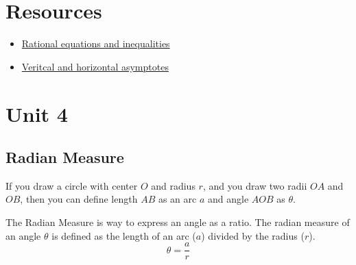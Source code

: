\documentclass{article}
\begin{document}
\section*{Resources}
\begin{itemize}
    \item \href{https://ximera.osu.edu/calcwithreview/calculusWithReview/rationalFunctions/digInRationalEqIneq}{Rational equations and inequalities}
    \item \href{https://www.andrews.edu/~rwright/Precalculus-RLW/Text/02-07.html#:~:text=A%20vertical%20asymptote%20of%20a,inputs%20approach%20%E2%88%9E%20or%20%E2%80%93%E2%88%9E.}{Veritcal and horizontal asymptotes }
\end{itemize}
\newpage

\section{Unit 4}
\subsection{Radian Measure}
If you draw a circle with center $O$ and radius $r$, and you draw two radii $OA$ and $OB$, then you can define length $AB$ as an arc $a$ and angle $AOB$ as $\theta$.

The Radian Measure is way to express an angle as a ratio. The radian measure of an angle $\theta$ is defined as the length of an arc ($a$) divided by the radius ($r$). 
$$\theta=\frac{a}{r}$$
\end{document}
